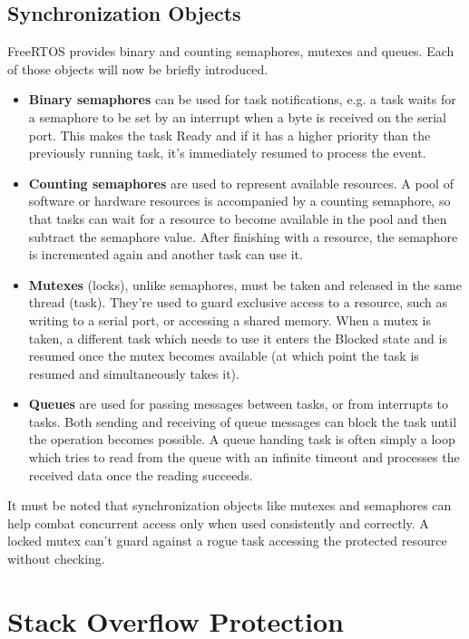\subsection{Synchronization Objects}

FreeRTOS provides binary and counting semaphores, mutexes and queues. Each of those objects will now be briefly introduced.

\begin{itemize}
	\item \textbf{Binary semaphores} can be used for task notifications, e.g. a task waits for a semaphore to be set by an interrupt when a byte is received on the serial port. This makes the task Ready and if it has a higher priority than the previously running task, it's immediately resumed to process the event.
	
	\item  \textbf{Counting semaphores} are used to represent available resources. A pool of software or hardware resources is accompanied by a counting semaphore, so that tasks can wait for a resource to become available in the pool and then subtract the semaphore value. After finishing with a resource, the semaphore is incremented again and another task can use it.
	
	\item \textbf{Mutexes} (locks), unlike semaphores, must be taken and released in the same thread (task). They're used to guard exclusive access to a resource, such as writing to a serial port, or accessing a shared memory. When a mutex is taken, a different task which needs to use it enters the Blocked state and is resumed once the mutex becomes available (at which point the task is resumed and simultaneously takes it).
	
	\item \textbf{Queues} are used for passing messages between tasks, or from interrupts to tasks. Both sending and receiving of queue messages can block the task until the operation becomes possible. A queue handing task is often simply a loop which tries to read from the queue with an infinite timeout and processes the received data once the reading succeeds.
\end{itemize}

It must be noted that synchronization objects like mutexes and semaphores can help combat concurrent access only when used consistently and correctly. A locked mutex can't guard against a rogue task accessing the protected resource without checking.

\section{Stack Overflow Protection}

